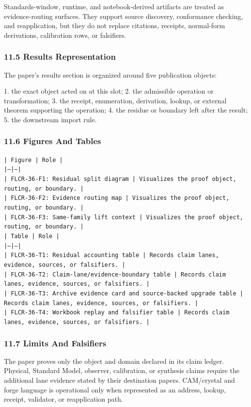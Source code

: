 \documentclass[11pt]{article}
\begin{document}
Standards-window, runtime, and notebook-derived artifacts are treated
as evidence-routing surfaces. They support source discovery, conformance
checking, and reapplication, but they do not replace citations, receipts,
normal-form derivations, calibration rows, or falsifiers.

\subsubsection*{11.5 Results Representation}

The paper's results section is organized around five publication objects:

1. the exact object acted on at this slot;
2. the admissible operation or transformation;
3. the receipt, enumeration, derivation, lookup, or external theorem supporting
   the operation;
4. the residue or boundary left after the result;
5. the downstream import rule.

\subsubsection*{11.6 Figures And Tables}

\noindent\texttt{| Figure | Role |}\\
\noindent\texttt{|---|---|}\\
\noindent\texttt{| FLCR-36-F1: Residual split diagram | Visualizes the proof object, routing, or boundary. |}\\
\noindent\texttt{| FLCR-36-F2: Evidence routing map | Visualizes the proof object, routing, or boundary. |}\\
\noindent\texttt{| FLCR-36-F3: Same-family lift context | Visualizes the proof object, routing, or boundary. |}\\

\noindent\texttt{| Table | Role |}\\
\noindent\texttt{|---|---|}\\
\noindent\texttt{| FLCR-36-T1: Residual accounting table | Records claim lanes, evidence, sources, or falsifiers. |}\\
\noindent\texttt{| FLCR-36-T2: Claim-lane/evidence-boundary table | Records claim lanes, evidence, sources, or falsifiers. |}\\
\noindent\texttt{| FLCR-36-T3: Archive evidence card and source-backed upgrade table | Records claim lanes, evidence, sources, or falsifiers. |}\\
\noindent\texttt{| FLCR-36-T4: Workbook replay and falsifier table | Records claim lanes, evidence, sources, or falsifiers. |}\\

\subsubsection*{11.7 Limits And Falsifiers}

The paper proves only the object and domain declared in its claim ledger.
Physical, Standard Model, observer, calibration, or synthesis claims require
the additional lane evidence stated by their destination papers. CAM/crystal
and forge language is operational only when represented as an address, lookup,
receipt, validator, or reapplication path.
\end{document}
